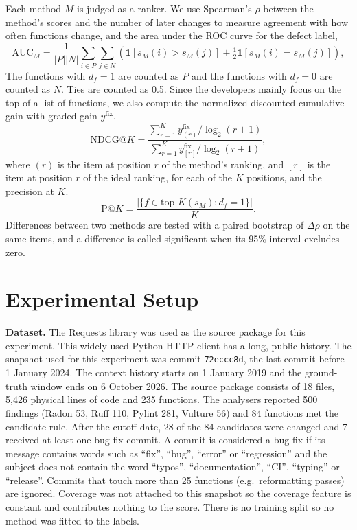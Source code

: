 \documentclass[12pt,onecolumn,draftclsnofoot]{IEEEtran}
\begin{document}
Each method $M$ is judged as a ranker. We use Spearman's $\rho$ between the method's scores and the number of later changes to measure agreement with how often functions change, and the area under the ROC curve for the defect label,
\begin{equation}
\mathrm{AUC}_M=\frac{1}{|P||N|}\sum_{i\in P}\sum_{j\in N}\left(\mathbf{1}[s_M(i)>s_M(j)]+\tfrac{1}{2}\mathbf{1}[s_M(i)=s_M(j)]\right),
\label{eq:auc}
\end{equation}
The functions with $d_f=1$ are counted as $P$ and the functions with $d_f=0$ are counted as $N$. Ties are counted as 0.5. Since the developers mainly focus on the top of a list of functions, we also compute the normalized discounted cumulative gain \cite{jarvelin2002} with graded gain $y^{\mathrm{fix}}$.
\begin{equation}
\mathrm{NDCG@}K=\frac{\sum_{r=1}^{K} y^{\mathrm{fix}}_{(r)}/\log_2(r+1)}{\sum_{r=1}^{K} y^{\mathrm{fix}}_{[r]}/\log_2(r+1)},
\label{eq:ndcg}
\end{equation}
where $(r)$ is the item at position $r$ of the method's ranking, and $[r]$ is the item at position $r$ of the ideal ranking, for each of the $K$ positions, and the precision at $K$.
\begin{equation}
\mathrm{P@}K=\frac{|\{f\in\text{top-}K(s_M): d_f=1\}|}{K}.
\label{eq:pk}
\end{equation}
Differences between two methods are tested with a paired bootstrap \cite{efron1993} of $\Delta\rho$ on the same items, and a difference is called significant when its 95\% interval excludes zero.

\section{Experimental Setup}
\label{sec:setup}

\textbf{Dataset.} The Requests library was used as the source package for this experiment. This widely used Python HTTP client has a long, public history. The snapshot used for this experiment was commit \texttt{72eccc8d}, the last commit before 1 January 2024. The context history starts on 1 January 2019 and the ground-truth window ends on 6 October 2026. The source package consists of 18 files, 5,426 physical lines of code and 235 functions. The analysers reported 500 findings (Radon 53, Ruff 110, Pylint 281, Vulture 56) and 84 functions met the candidate rule. After the cutoff date, 28 of the 84 candidates were changed and 7 received at least one bug-fix commit. A commit is considered a bug fix if its message contains words such as ``fix'', ``bug'', ``error'' or ``regression'' and the subject does not contain the word ``typos'', ``documentation'', ``CI'', ``typing'' or ``release''. Commits that touch more than 25 functions (e.g.\ reformatting passes) are ignored. Coverage was not attached to this snapshot so the coverage feature is constant and contributes nothing to the score. There is no training split so no method was fitted to the labels.
\end{document}
